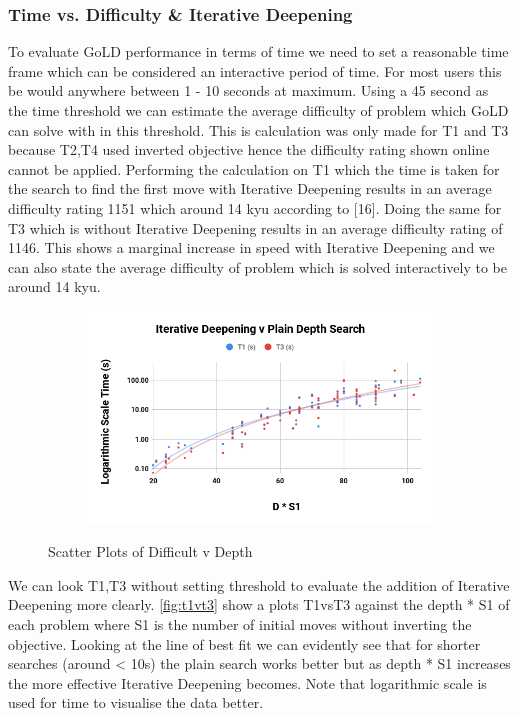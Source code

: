 \documentclass{l4proj}
\begin{document}
\subsubsection{Time vs. Difficulty \& Iterative Deepening}
To evaluate GoLD performance in terms of time we need to set a reasonable time frame which can be considered an interactive period of time. For most users this be would anywhere between 1 - 10 seconds at maximum. Using a 45 second as the time threshold we can estimate the average difficulty of problem which GoLD can solve with in this threshold. This is calculation was only made for T1 and T3 because T2,T4 used inverted objective hence the difficulty rating shown online cannot be applied. Performing the calculation on T1 which the time is taken for the search to find the first move with Iterative Deepening results in an average difficulty rating 1151 which around 14 kyu according to [16]. Doing the same for T3 which is without Iterative Deepening results in an average difficulty rating of 1146.  This shows a marginal increase in speed with Iterative Deepening and we can also state the average difficulty of problem which is solved interactively to be around 14 kyu.



\begin{figure}[!h]
\centering
\begin{subfigure}[b]{\textwidth}
\centering
\includegraphics[width=\textwidth]{edvd/t1vt3.png}
\end{subfigure}
\caption{Scatter Plots of Difficult v Depth}
\label{fig:t1vt3}
\end{figure}




We can look T1,T3 without setting threshold to evaluate the addition of Iterative Deepening more clearly. \autoref{fig:t1vt3} show a plots T1vsT3 against the depth * S1 of each problem where S1 is the number of initial moves without inverting the objective. Looking at the line of best fit we can evidently see that for shorter searches (around < 10s) the plain search works better but as depth * S1 increases the more effective Iterative Deepening becomes. Note that logarithmic scale is used for time to visualise the data better.
\end{document}

